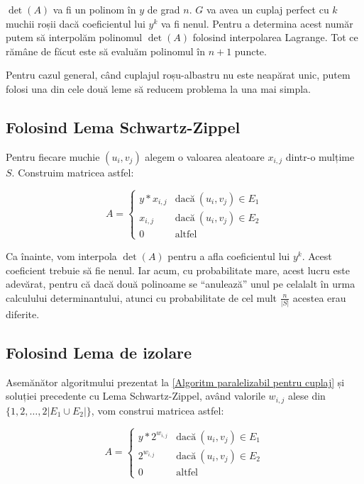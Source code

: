 $\det(A)$ va fi un polinom în $y$ de grad $n$. $G$ va avea un cuplaj perfect cu
$k$ muchii roșii dacă coeficientul lui $y^{k}$ va fi nenul. Pentru a determina
acest număr putem să interpolăm polinomul $\det(A)$ folosind interpolarea
Lagrange. Tot ce rămâne de făcut este să evaluăm polinomul în $n+1$ puncte. \par

Pentru cazul general, când cuplajul roșu-albastru nu este neapărat unic, putem
folosi una din cele două leme să reducem problema la una mai simpla.

\subsection{Folosind Lema Schwartz-Zippel}

Pentru fiecare muchie $(u_{i}, v_{j})$ alegem o valoarea aleatoare $x_{i,j}$ dintr-o
mulțime $S$. Construim matricea astfel:

\begin{equation}
  A=
  \begin{cases}
    y * x_{i,j} & \text{dacă}\ (u_{i}, v_{j}) \in E_{1} \\
    x_{i,j} & \text{dacă}\ (u_{i}, v_{j}) \in E_{2} \\
    0 & \text{altfel}
  \end{cases}
\end{equation}

Ca înainte, vom interpola $\det(A)$ pentru a afla coeficientul lui $y^{k}$.
Acest coeficient trebuie să fie nenul. Iar acum, cu probabilitate mare, acest
lucru este adevărat, pentru că dacă două polinoame se ``anulează'' unul pe
celalalt în urma calculului determinantului, atunci cu probabilitate de cel mult
$\frac{n}{|S|}$ acestea erau diferite.

\subsection{Folosind Lema de izolare}
Asemănător algoritmului prezentat la \ref{Algoritm paralelizabil pentru cuplaj}
și soluției precedente cu Lema Schwartz-Zippel, având valorile $w_{i,j}$ alese
din $\{1, 2, \ldots, 2|E_{1} \cup E_{2}|\}$, vom construi matricea astfel:

\begin{equation}
  A=
  \begin{cases}
    y * 2^{w_{i,j}} & \text{dacă}\ (u_{i}, v_{j}) \in E_{1} \\
    2^{w_{i,j}} & \text{dacă}\ (u_{i}, v_{j}) \in E_{2} \\
    0 & \text{altfel}
  \end{cases}
\end{equation}

